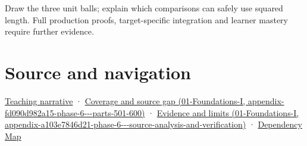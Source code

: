 Draw the three unit balls; explain which comparisons can safely use squared length. Full production proofs, target-specific integration and learner mastery require further evidence.

\section{Source and navigation}\label{appendix-49933872bb51-source-and-navigation}

\href{Continuous\%20Notes/Computing\%20Foundations\%20-\%20From\%20Bits\%20to\%20C++\%20and\%20Systems\%20APIs\#A\%20ruler\%20needs\%20more\%20than\%20coordinate\%20components}{Teaching narrative} · \href{../01-Foundations-I/main.pdf\#nameddest=appendix-fd090d982a15-phase-6---parts-501-600}{Coverage and source gap (01-Foundations-I, appendix-fd090d982a15-phase-6-\/-\/-parts-501-600)} · \href{../01-Foundations-I/main.pdf\#nameddest=appendix-a103e7846d21-phase-6---source-analysis-and-verification}{Evidence and limits (01-Foundations-I, appendix-a103e7846d21-phase-6-\/-\/-source-analysis-and-verification)} · \hyperref[appendix-4ad47bdd269a]{Dependency Map}
